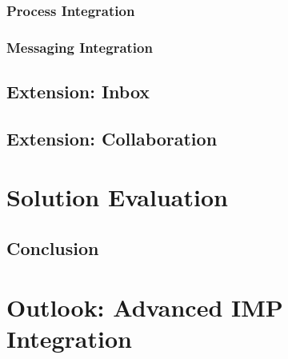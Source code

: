 \documentclass[
     12pt,         %
     a4paper,      %
     BCOR=10mm,version=first,     %
     DIV=14,version=first,        %
     ]{scrreprt}
\begin{document}
\subsection{Process Integration}

\subsection{Messaging Integration}

\section{Extension: Inbox}

\section{Extension: Collaboration}

\chapter{Solution Evaluation}

\section{Conclusion}

\chapter{Outlook: Advanced IMP Integration}

\printbibliography
\end{document}
